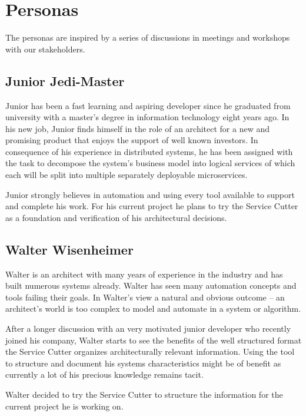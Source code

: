 
\section{Personas}

The personas are inspired by a series of discussions in meetings and workshops with our stakeholders.

\subsection{Junior Jedi-Master}

Junior has been a fast learning and aspiring developer since he graduated from university with a master's degree in information technology eight years ago. In his new job, Junior finds himself in the role of an architect for a new and promising product that enjoys the support of well known investors. In consequence of his experience in distributed systems, he has been assigned with the task to decompose the system's business model into logical services of which each will be split into multiple separately deployable microservices. 

Junior strongly believes in automation and using every tool available to support and complete his work. For his current project he plans to try the Service Cutter as a foundation and verification of his architectural decisions. 


\subsection{Walter Wisenheimer}

Walter is an architect with many years of experience in the industry and has built numerous systems already. Walter has seen many automation concepts and tools failing their goals. In Walter's view a natural and obvious outcome -- an architect's world is too complex to model and automate in a system or algorithm. 

After a longer discussion with an very motivated junior developer who recently joined his company, Walter starts to see the benefits of the well structured format the Service Cutter organizes architecturally relevant information. Using the tool to structure and document his systems characteristics might be of benefit as currently a lot of his precious knowledge remains tacit\cite{zimmermann2015architectural}. 

Walter decided to try the Service Cutter to structure the information for the current project he is working on.



